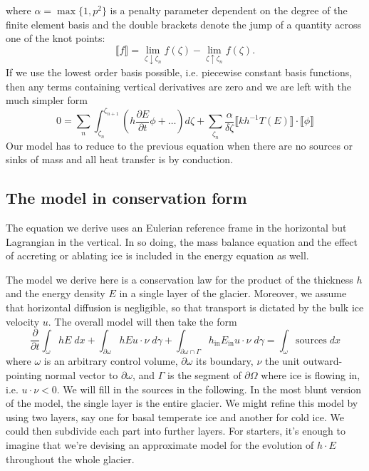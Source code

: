 \documentclass{article}
\theoremstyle{definition}
\theoremstyle{plain}
\begin{document}
where $\alpha = \max\{1, p^2\}$ is a penalty parameter dependent on the degree of the finite element basis and the double brackets denote the jump of a quantity across one of the knot points:
\begin{equation}
    \llbracket f\rrbracket = \lim_{\zeta\downarrow\zeta_n}f(\zeta) - \lim_{\zeta\uparrow\zeta_n}f(\zeta).
\end{equation}
If we use the lowest order basis possible, i.e. piecewise constant basis functions, then any terms containing vertical derivatives are zero and we are left with the much simpler form
\begin{equation}
    0 = \sum_n\int_{\zeta_n}^{\zeta_{n + 1}}\left(h\frac{\partial E}{\partial t}\phi + \ldots\right)d\zeta + \sum_{\zeta_n}\frac{\alpha}{\delta\zeta}\llbracket kh^{-1}T(E)\rrbracket\cdot\llbracket\phi\rrbracket
\end{equation}
Our model has to reduce to the previous equation when there are no sources or sinks of mass and all heat transfer is by conduction.


\subsection{The model in conservation form}

The equation we derive uses an Eulerian reference frame in the horizontal but Lagrangian in the vertical.
In so doing, the mass balance equation and the effect of accreting or ablating ice is included in the energy equation as well.

The model we derive here is a conservation law for the product of the thickness $h$ and the energy density $E$ in a single layer of the glacier.
Moreover, we assume that horizontal diffusion is negligible, so that transport is dictated by the bulk ice velocity $u$.
The overall model will then take the form
\begin{equation}
    \frac{\partial}{\partial t}\int_\omega hE\;dx + \int_{\partial\omega}hEu\cdot\nu\;d\gamma + \int_{\partial\omega\cap\Gamma}h_{\text{in}}E_{\text{in}}u\cdot\nu\;d\gamma= \int_\omega\text{sources}\;dx
\end{equation}
where $\omega$ is an arbitrary control volume, $\partial\omega$ its boundary, $\nu$ the unit outward-pointing normal vector to $\partial\omega$, and $\Gamma$ is the segment of $\partial\Omega$ where ice is flowing in, i.e. $u\cdot\nu < 0$.
We will fill in the sources in the following.
In the most blunt version of the model, the single layer is the entire glacier.
We might refine this model by using two layers, say one for basal temperate ice and another for cold ice.
We could then subdivide each part into further layers.
For starters, it's enough to imagine that we're devising an approximate model for the evolution of $h\cdot E$ throughout the whole glacier.
\end{document}
